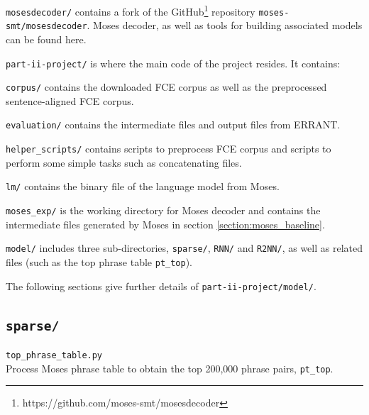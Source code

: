 \documentclass[12pt,a4paper,twoside,openright]{report}
\begin{document}
\texttt{mosesdecoder/} contains a fork of the GitHub\footnote{https://github.com/moses-smt/mosesdecoder} repository \texttt{moses-smt/mosesdecoder}\cite{moses}. Moses decoder, as well as tools for building associated models can be found here.

\texttt{part-ii-project/} is where the main code of the project resides. It contains:

\hfill\begin{minipage}{\dimexpr\textwidth-1cm}
    \texttt{corpus/} contains the downloaded FCE corpus as well as the preprocessed sentence-aligned FCE corpus.
\end{minipage}

\hfill\begin{minipage}{\dimexpr\textwidth-1cm}
    \texttt{evaluation/} contains the intermediate files and output files from ERRANT.
\end{minipage}

\hfill\begin{minipage}{\dimexpr\textwidth-1cm}
    \texttt{helper\_scripts/} contains scripts to preprocess FCE corpus and scripts to perform some simple tasks such as concatenating files.
\end{minipage}

\hfill\begin{minipage}{\dimexpr\textwidth-1cm}
    \texttt{lm/} contains the binary file of the language model from Moses.
\end{minipage}

\hfill\begin{minipage}{\dimexpr\textwidth-1cm}
    \texttt{moses\_exp/} is the working directory for Moses decoder and contains the intermediate files generated by Moses in section \ref{section:moses_baseline}.
\end{minipage}

\hfill\begin{minipage}{\dimexpr\textwidth-1cm}
    \texttt{model/} includes three sub-directories, \texttt{sparse/}, \texttt{RNN/} and \texttt{R2NN/}, as well as related files (such as the top phrase table \texttt{pt\_top}).
\end{minipage}

The following sections give further details of \texttt{part-ii-project/model/}.

\subsection{\texttt{sparse/}}
\texttt{top\_phrase\_table.py}\\
Process Moses phrase table to obtain the top 200,000 phrase pairs, \texttt{pt\_top}.
\end{document}
